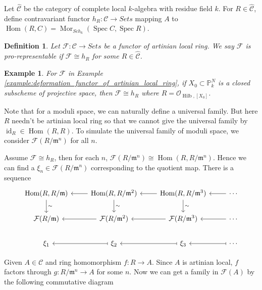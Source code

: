\documentclass{ctexart}
\newtheorem{definition}{Definition}[section]
\newtheorem{example}{Example}[section]
\renewcommand{\hom}{\operatorname{Hom}}
\newcommand{\identity}{\operatorname{id}}
\newcommand{\mor}{\operatorname{Mor}}
\newcommand{\spec}{\operatorname{Spec}}
\newcommand{\hilbertscheme}{\operatorname{Hilb}}
\begin{document}
Let $\widehat{\mathcal{C}}$ be the category of complete local $k$-algebra with residue field $k$.
For $R\in \widehat{\mathcal{C}}$, define contravariant functor $h_{R}: \mathcal{C} \rightarrow Sets$ mapping $A$ to $\hom(R, C) = \mor_{Sch_{k}}(\spec C, \spec R)$.
\begin{definition}
    Let $\mathcal{F}: \mathcal{C} \rightarrow Sets$ be a functor of artinian local ring.
    We say $\mathcal{F}$ is pro-representable if $\mathcal{F} \cong h_{R}$ for some $R\in \widehat{\mathcal{C}}$.
\end{definition} 
\begin{example}
    For $\mathcal{F}$ in Example \ref{example:deformation_functor_of_artinian_local_ring}, if $X_{0} \subset \mathbb{P}_{k}^{N}$ is a closed subscheme of projective space, 
    then $\mathcal{F} \cong h_{R}$ where $R = \widehat{\mathcal{O}_{\hilbertscheme, [X_{0}]}}$.
\end{example}
Note that for a moduli space, we can naturally define a universal family.
But here $R$ needn't be artinian local ring so that we cannot give the universal family by $\identity_{R}\in \hom(R, R)$.
To simulate the universal family of moduli space, we consider $\mathcal{F}(R/\mathfrak{m}^{n})$ for all $n$.
\par
Assume $\mathcal{F} \cong h_{R}$, then for each $n$, $\mathcal{F}(R/\mathfrak{m}^{n}) \cong \hom(R, R/\mathfrak{m}^{n})$.
Hence we can find a $\xi_{n}\in \mathcal{F}(R/\mathfrak{m}^{n})$ corresponding to the quotient map.
There is a sequence
\begin{equation}
    \begin{tikzcd}
        \hom(R, R/\mathfrak{m}) \arrow[d, "\sim"] &
        \hom(R, R/\mathfrak{m}^{2}) \arrow[d, "\sim"] \arrow[l] &
        \hom(R, R/\mathfrak{m}^{3}) \arrow[d, "\sim"] \arrow[l] &
        \cdots \arrow[l] \\
        \mathcal{F}(R/\mathfrak{m}) &
        \mathcal{F}(R/\mathfrak{m}^{2}) \arrow[l] &
        \mathcal{F}(R/\mathfrak{m}^{3}) \arrow[l] &
        \cdots \arrow[l] \\
        \xi_{1} &
        \xi_{2} \arrow[l, mapsto] &
        \xi_{3} \arrow[l, mapsto] &
        \cdots \arrow[l, mapsto]
    \end{tikzcd}
\end{equation}
\par
Given $A\in \mathcal{C}$ and ring homomorphism $f: R \rightarrow A$.
Since $A$ is artinian local, $f$ factors through $g: R/\mathfrak{m}^{n} \rightarrow A$ for some $n$.
Now we can get a family in $\mathcal{F}(A)$ by the following commutative diagram
\end{document}
